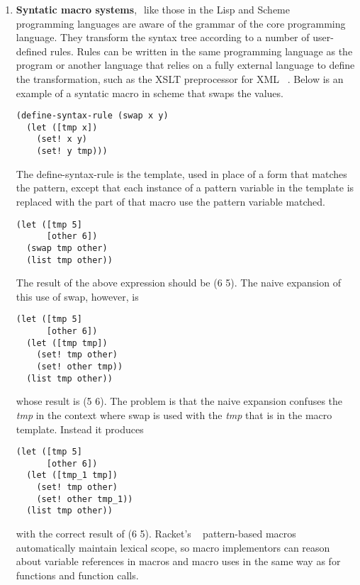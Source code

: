 \begin{enumerate}
The solution is to give the macro's variables names that do not conflict with any variable in the current program:
\textcolor{white}{``}
\begin{lstlisting}[frame=single]
#define INCI(i) {int INCIa=0; ++i;}
int main(void)
 {
    int a = 0, b = 0;
    INCI(a);
    INCI(b);
    printf("a is now %d, b is now %d\n", a, b);
    return 0;
 }
\end{lstlisting}
\textcolor{white}{''}
this solution produces the correct output:
\begin{lstlisting}[frame=single]
a is now 1, b is now 1
\end{lstlisting}
The problem is solved for the current program, but this solution is not robust. This is where we require hygiene macro system which help in preserving the lexical scoping of all identifiers.

\item {\bf Syntatic macro systems},\textcolor{white}{"} like those in the Lisp and Scheme ~\cite{bib12} programming languages are aware of the grammar of the core programming language. They transform the syntax tree according to a number of user-defined rules. Rules can be written in the same programming language as the program or another language that relies on a fully external language to define the transformation, such as the XSLT preprocessor for XML ~\cite{bib3}. Below is an example of a syntatic macro in scheme that swaps the values.\textcolor{white}{"}
\begin{lstlisting}[frame=single]
(define-syntax-rule (swap x y)
  (let ([tmp x])
    (set! x y)
    (set! y tmp))) 
\end{lstlisting}
The define-syntax-rule is the template, used in place of a form that matches the pattern, except that each instance of a pattern variable in the template is replaced with the part of that macro use the pattern variable matched. 
\begin{lstlisting}[frame=single]
(let ([tmp 5]
      [other 6])
  (swap tmp other)
  (list tmp other))
\end{lstlisting}  
The result of the above expression should be (6 5). The naive expansion of this use of swap, however, is
\begin{lstlisting}[frame=single]
(let ([tmp 5]
      [other 6])
  (let ([tmp tmp])
    (set! tmp other)
    (set! other tmp))
  (list tmp other))
\end{lstlisting} 
 whose result is (5 6). The problem is that the naive expansion confuses the \textit{tmp} in the context where swap is used with the \textit{tmp} that is in the macro template. Instead it produces
 
 \begin{lstlisting}[frame=single]
 (let ([tmp 5]
      [other 6])
  (let ([tmp_1 tmp])
    (set! tmp other)
    (set! other tmp_1))
  (list tmp other))
 \end{lstlisting}  
with the correct result of (6 5). Racket's ~\cite{bib14}  pattern-based macros automatically maintain lexical scope, so macro implementors can reason about variable references in macros and macro uses in the same way as for functions and function calls.
\end{enumerate}

